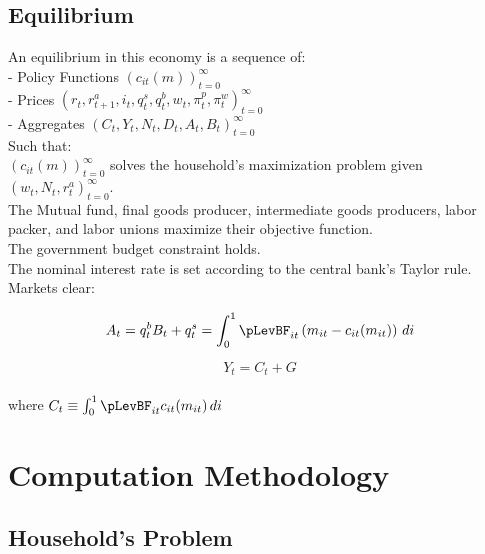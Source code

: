 \documentclass[titlepage]{\econtex}\providecommand{\texname}{FBS-NK}
\begin{document}
\hypertarget{Equilibrium}{}
\subsection{Equilibrium}


An equilibrium in this economy is a sequence of: \\

- Policy Functions $\left( c_{it}(m) \right )_{t=0}^{\infty}$ \\

- Prices $ \left(r_{t},  r^{a}_{t+1}, i_{t}, q^{s}_{t}, q^{b}_{t}, w_{t} , \pi^{p}_{t}, \pi^{w}_{t} \right) _{t=0}^{\infty}$\\

- Aggregates $ \left(C_{t}, Y_{t} , N_{t}, D_{t} , A_{t} , B_{t} \right)_{t=0}^{\infty}$\\

Such that: \\

$ \left(  c_{it}(m)\right)_{t=0}^{\infty}$  solves the household's maximization problem given $  \left( w_{t}, N_{t},  r^{a}_{t} \right)_{t=0}^{\infty}$.\\

The Mutual fund, final goods producer, intermediate goods producers, labor packer, and labor unions maximize their objective function. \\

The government budget constraint holds. \\

The nominal interest rate is set according to the central bank's Taylor rule. \\


Markets clear:

 $$ A_t = q^{b}_{t} B_{t} + q^{s}_{t} =  \int_{0}^{1} \pLevBF_{it}\left( m_{it} - c_{it}(m_{it})\right) \, di $$
 
 $$ Y_t = C_{t} +G $$ \\
 
 where $C_{t} \equiv  \int_{0}^{1} \pLevBF_{it} c_{it}(m_{it})\, di $ \\


\hypertarget{Computational Methodology}{}
\section{Computation Methodology}

\hypertarget{Household's Problem}{}
\subsection{Household's Problem}
\end{document}
